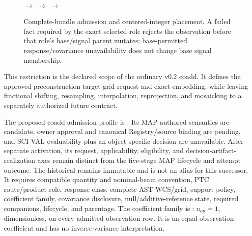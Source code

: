 \documentclass[10pt]{article}
\begin{document}
\begin{figure}[h]
\centering
\begin{minipage}[c]{0.18\linewidth}\centering
{}\\[0.22em]
\end{minipage}
\hfill\(\longrightarrow\)\hfill
{}
\hfill\(\longrightarrow\)\hfill
{}
\hfill\(\longrightarrow\)\hfill
{}
\caption{Complete-bundle admission and centered-integer placement. A failed
fact required by the exact selected role rejects the observation before that
role's base/signal parent mutates; base-permitted response/covariance
unavailability does not change base signal membership.}
\label{fig:coadd}
\end{figure}

This restriction is the declared scope of the ordinary v0.2 coadd. It defines
the approved preconstruction target-grid request and exact embedding, while
leaving fractional shifting, resampling, interpolation, reprojection, and
mosaicking to a separately authorized future contract.

The proposed coadd-admission profile is \SCIMapCoaddProfile. Its MAP-authored
semantics are candidate, owner approval and canonical Registry/source binding
are pending, and SCI-VAL evaluability plus an object-specific decision are
unavailable. After separate activation, its request, applicability, eligibility,
and decision-artifact-realization axes remain distinct from the five-stage MAP
lifecycle and attempt outcome.
The historical \SCIMapCoaddProfileHistorical{} remains immutable and is not an
alias for this successor. It requires compatible quantity
and nominal-beam convention, PTC route/product role, response class, complete
AST WCS/grid, support policy, coefficient family, covariance disclosure,
null/additive-reference state, required companions, lifecycle, and parentage.
The coefficient family is
\SCIMapUniformCoaddProfile: \(u_{op}=1\),
dimensionless, on every admitted observation row. It is an equal-observation
coefficient and has no inverse-variance interpretation.
\end{document}
